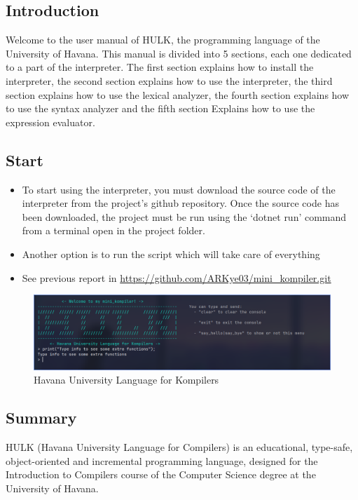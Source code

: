 \newcommand{\copiabletext}[2]{%
    \href{#2}{\texttt{#1}}%
}

\begin{center}
    \centering
    \section{Introduction}
\end{center}
Welcome to the user manual of HULK, the programming language of the University of Havana. This manual is divided into 5 sections, each one dedicated to a part of the interpreter. The first section explains how to install the interpreter, the second section explains how to use the interpreter, the third section explains how to use the lexical analyzer, the fourth section explains how to use the syntax analyzer and the fifth section Explains how to use the expression evaluator.

\subsection{Start}
    \begin{itemize}
        \item To start using the interpreter, you must download the source code of the interpreter from the project's github repository. Once the source code has been downloaded, the project must be run using the `dotnet run' command from a terminal open in the project folder.
        \item Another option is to run the script which will take care of everything
        \item See previous report in \url{https://github.com/ARKye03/mini_kompiler.git}
    \end{itemize}

\begin{figure}[h]
    \includegraphics[width=1\textwidth]{assets/hulk_scr.png}
    \caption{Havana University Language for Kompilers}
\end{figure}
    
\subsection{Summary}
HULK (Havana University Language for Compilers) is an educational, type-safe, object-oriented and incremental programming language, designed for the Introduction to Compilers course of the Computer Science degree at the University of Havana.

